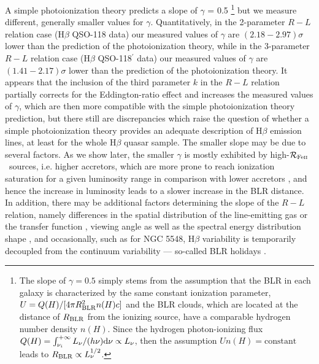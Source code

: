 \documentclass[a4paper,fleqn,usenatbib]{mnras}
\newcommand{\rfe}{${\cal R}_{\rm{Fe\textsc{ii}}}$}
\begin{document}
A simple photoionization theory predicts a slope of $\gamma$ = 0.5 \citep{1993ApJ...404L..51N,2005ApJ...629...61K,2011A&A...525L...8C,2013peag.book.....N,2019arXiv190106507K}\footnote{The slope of $\gamma=0.5$ simply stems from the assumption that the BLR in each galaxy is characterized by the same constant ionization parameter, $U=Q(H)/[4\pi R_{\rm BLR}^2 n(H) c]$ and the BLR clouds, which are located at the distance of $R_{\rm BLR}$ from the ionizing source, have a comparable hydrogen number density $n(H)$. Since the hydrogen photon-ionizing flux $Q(H)=\int_{\nu_i}^{+\infty} L_{\rm \nu}/(h\nu)\mathrm{d}\nu\propto L_{\nu}$, then the assumption $Un(H)=\text{constant}$ leads to $R_{\rm BLR} \propto L_{\nu}^{1/2}$.} but we measure different, generally smaller values for $\gamma$. Quantitatively, in the 2-parameter $R-L$ relation case (H$\beta$ QSO-118 data) our measured values of $\gamma$ are $(2.18-2.97)\sigma$ lower than the prediction of the photoionization theory, while in the 3-parameter $R-L$ relation case (H$\beta$ QSO-118$^{\prime}$ data) our measured values of $\gamma$ are $(1.41-2.17)\sigma$ lower than the prediction of the photoionization theory. It appears that the inclusion of the third parameter $k$ in the $R-L$ relation partially corrects for the Eddington-ratio effect and increases the measured values of $\gamma$, which are then more compatible with the simple photoionization theory prediction, but there still are discrepancies which raise the question of whether a simple photoionization theory provides an adequate description of H$\beta$ emission lines, at least for the whole H$\beta$ quasar sample. The smaller slope may be due to several factors. As we show later, the smaller $\gamma$ is mostly exhibited by high-\rfe\ sources, i.e. higher accretors, which are more prone to reach ionization saturation for a given luminosity range in comparison with lower accretors \citep{guo2020}, and hence the increase in luminosity leads to a slower increase in the BLR distance. In addition, there may be additional factors determining the slope of the $R-L$ relation, namely differences in the spatial distribution of the line-emitting gas or the transfer function \citep{1995MNRAS.276..933R}, viewing angle as well as the spectral energy distribution shape  \citep{1997ApJ...490L.131W}, and occasionally, such as for NGC 5548, H$\beta$ variability is temporarily decoupled from the continuum variability --- so-called BLR holidays \citep{2019ApJ...882L..30D}.
\end{document}

